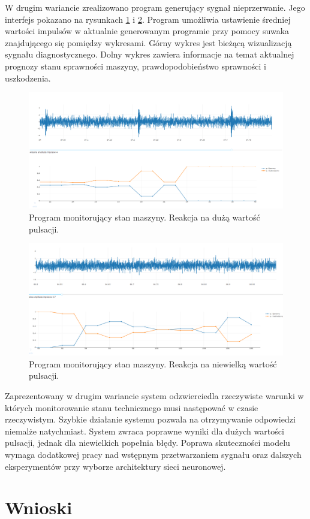 \documentclass[inzynierska]{pwr_wmat_praca_dyplomowa}
\theoremstyle{plain}
\numberwithin{theorem}{chapter}
\theoremstyle{definition}
\numberwithin{theorem}{chapter}
\begin{document}
W drugim wariancie zrealizowano program generujący sygnał nieprzerwanie. Jego interfejs pokazano na rysunkach \ref{monitor_live_1} i \ref{monitor_live_2}. Program umożliwia ustawienie średniej wartości impulsów w aktualnie generowanym programie przy pomocy suwaka znajdującego się pomiędzy wykresami. Górny wykres jest bieżącą wizualizacją sygnału diagnostycznego. Dolny wykres zawiera informacje na temat aktualnej prognozy stanu sprawności maszyny, prawdopodobieństwo sprawności i uszkodzenia.
\begin{figure}[ht]
	\centering
	\includegraphics[scale=0.4]{images/monitor_live_1.png}
	\caption{Program monitorujący stan maszyny. Reakcja na dużą wartość pulsacji.}
	\label{monitor_live_1}
\end{figure}

\begin{figure}[H]
	\centering
	\includegraphics[scale=0.4]{images/monitor_live_2.png}
	\caption{Program monitorujący stan maszyny. Reakcja na niewielką wartość pulsacji.}
	\label{monitor_live_2}
\end{figure}

Zaprezentowany w drugim wariancie system odzwierciedla rzeczywiste warunki w których monitorowanie stanu technicznego musi następować w czasie rzeczywistym. Szybkie działanie systemu pozwala na otrzymywanie odpowiedzi niemalże natychmiast. System zwraca poprawne wyniki dla dużych wartości pulsacji, jednak dla niewielkich popełnia błędy. Poprawa skuteczności modelu wymaga dodatkowej pracy nad wstępnym przetwarzaniem sygnału oraz dalszych eksperymentów przy wyborze architektury sieci neuronowej.
{\backmatter \chapter{Wnioski}}
\newpage
\end{document}

